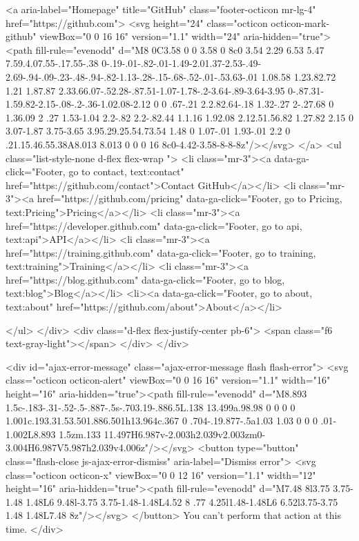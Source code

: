     <a aria-label="Homepage" title="GitHub" class="footer-octicon mr-lg-4" href="https://github.com">
      <svg height="24" class="octicon octicon-mark-github" viewBox="0 0 16 16" version="1.1" width="24" aria-hidden="true"><path fill-rule="evenodd" d="M8 0C3.58 0 0 3.58 0 8c0 3.54 2.29 6.53 5.47 7.59.4.07.55-.17.55-.38 0-.19-.01-.82-.01-1.49-2.01.37-2.53-.49-2.69-.94-.09-.23-.48-.94-.82-1.13-.28-.15-.68-.52-.01-.53.63-.01 1.08.58 1.23.82.72 1.21 1.87.87 2.33.66.07-.52.28-.87.51-1.07-1.78-.2-3.64-.89-3.64-3.95 0-.87.31-1.59.82-2.15-.08-.2-.36-1.02.08-2.12 0 0 .67-.21 2.2.82.64-.18 1.32-.27 2-.27.68 0 1.36.09 2 .27 1.53-1.04 2.2-.82 2.2-.82.44 1.1.16 1.92.08 2.12.51.56.82 1.27.82 2.15 0 3.07-1.87 3.75-3.65 3.95.29.25.54.73.54 1.48 0 1.07-.01 1.93-.01 2.2 0 .21.15.46.55.38A8.013 8.013 0 0 0 16 8c0-4.42-3.58-8-8-8z"/></svg>
</a>
   <ul class="list-style-none d-flex flex-wrap ">
        <li class="mr-3"><a data-ga-click="Footer, go to contact, text:contact" href="https://github.com/contact">Contact GitHub</a></li>
        <li class="mr-3"><a href="https://github.com/pricing" data-ga-click="Footer, go to Pricing, text:Pricing">Pricing</a></li>
      <li class="mr-3"><a href="https://developer.github.com" data-ga-click="Footer, go to api, text:api">API</a></li>
      <li class="mr-3"><a href="https://training.github.com" data-ga-click="Footer, go to training, text:training">Training</a></li>
        <li class="mr-3"><a href="https://blog.github.com" data-ga-click="Footer, go to blog, text:blog">Blog</a></li>
        <li><a data-ga-click="Footer, go to about, text:about" href="https://github.com/about">About</a></li>

    </ul>
  </div>
  <div class="d-flex flex-justify-center pb-6">
    <span class="f6 text-gray-light"></span>
  </div>
</div>



  <div id="ajax-error-message" class="ajax-error-message flash flash-error">
    <svg class="octicon octicon-alert" viewBox="0 0 16 16" version="1.1" width="16" height="16" aria-hidden="true"><path fill-rule="evenodd" d="M8.893 1.5c-.183-.31-.52-.5-.887-.5s-.703.19-.886.5L.138 13.499a.98.98 0 0 0 0 1.001c.193.31.53.501.886.501h13.964c.367 0 .704-.19.877-.5a1.03 1.03 0 0 0 .01-1.002L8.893 1.5zm.133 11.497H6.987v-2.003h2.039v2.003zm0-3.004H6.987V5.987h2.039v4.006z"/></svg>
    <button type="button" class="flash-close js-ajax-error-dismiss" aria-label="Dismiss error">
      <svg class="octicon octicon-x" viewBox="0 0 12 16" version="1.1" width="12" height="16" aria-hidden="true"><path fill-rule="evenodd" d="M7.48 8l3.75 3.75-1.48 1.48L6 9.48l-3.75 3.75-1.48-1.48L4.52 8 .77 4.25l1.48-1.48L6 6.52l3.75-3.75 1.48 1.48L7.48 8z"/></svg>
    </button>
    You can’t perform that action at this time.
  </div>


